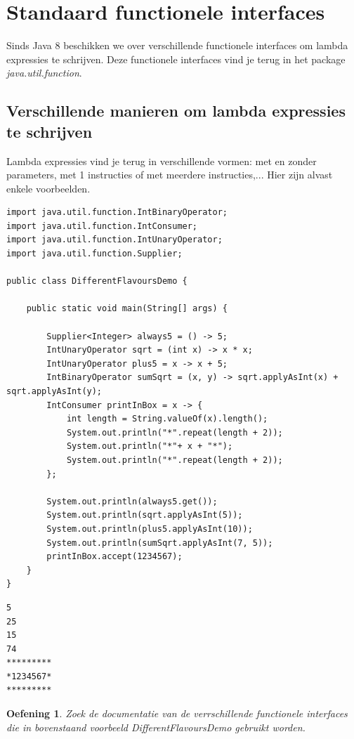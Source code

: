 \documentclass{tstextbook}
\newtheorem{envoefening}{Oefening}[chapter]
\newenvironment{oefening}
               {\begin{boxexercise}\begin{envoefening}}
               {\end{envoefening}\end{boxexercise}}
\begin{document}
\section{Standaard functionele interfaces}

Sinds Java 8 beschikken we over verschillende functionele interfaces om lambda expressies te schrijven. Deze functionele interfaces vind je terug in het package \textit{java.util.function}.

\subsection{Verschillende manieren om lambda expressies te schrijven}

Lambda expressies vind je terug in verschillende vormen: met en zonder parameters, met 1 instructies of met meerdere instructies,... Hier zijn alvast enkele voorbeelden.

\begin{lstlisting}
import java.util.function.IntBinaryOperator;
import java.util.function.IntConsumer;
import java.util.function.IntUnaryOperator;
import java.util.function.Supplier;

public class DifferentFlavoursDemo {

	public static void main(String[] args) {

		Supplier<Integer> always5 = () -> 5;
		IntUnaryOperator sqrt = (int x) -> x * x;
		IntUnaryOperator plus5 = x -> x + 5;
		IntBinaryOperator sumSqrt = (x, y) -> sqrt.applyAsInt(x) + sqrt.applyAsInt(y);
		IntConsumer printInBox = x -> {
			int length = String.valueOf(x).length();
			System.out.println("*".repeat(length + 2));
			System.out.println("*"+ x + "*");
			System.out.println("*".repeat(length + 2));
		};

		System.out.println(always5.get());
		System.out.println(sqrt.applyAsInt(5));
		System.out.println(plus5.applyAsInt(10));
		System.out.println(sumSqrt.applyAsInt(7, 5));
		printInBox.accept(1234567);
	}
}
\end{lstlisting}

\begin{verbatim}
5
25
15
74
*********
*1234567*
*********
\end{verbatim}

\begin{oefening}
Zoek de documentatie van de verrschillende functionele interfaces die in bovenstaand voorbeeld DifferentFlavoursDemo gebruikt worden.
\end{oefening}
\end{document}
